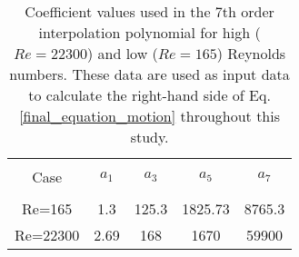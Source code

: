 \begin{table}[ht]

\begin{center}
\setlength{\unitlength}{\textwidth}

\begin{tabular}{c c c c c} %
\hline\hline %
\\[0.2ex]
Case & $a_1$ & $a_3$ & $a_5$ & $a_7$ \\ [0.8ex] %
\hline 
\\[0.8ex]%
Re=165 & 1.3 & 125.3 & 1825.73 & 8765.3 \\[0.8ex] %
Re=22300 & 2.69 & 168 & 1670 & 59900 \\ [1ex] %
\hline %
\end{tabular}

\caption{Coefficient values used in the 7th order interpolation polynomial for high ($Re=22300$) and low ($Re=165$) Reynolds numbers. These data are used as input data to calculate the right-hand side of Eq. \ref{final_equation_motion} throughout this study.}
 
\label{table:cy-coefficients} %
\end{center}
\end{table}

